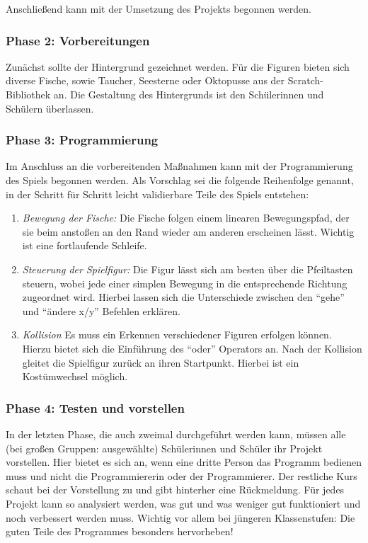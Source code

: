 Anschließend kann mit der Umsetzung des Projekts begonnen werden.

\subsubsection{Phase 2: Vorbereitungen}\label{phase-2-vorbereitungen}

Zunächst sollte der Hintergrund gezeichnet werden. Für die Figuren
bieten sich diverse Fische, sowie Taucher, Seesterne oder Oktopusse aus
der Scratch-Bibliothek an. Die Gestaltung des Hintergrunds ist den
Schülerinnen und Schülern überlassen.

\subsubsection{Phase 3: Programmierung}\label{phase-3-programmierung}

Im Anschluss an die vorbereitenden Maßnahmen kann mit der Programmierung
des Spiels begonnen werden. Als Vorschlag sei die folgende Reihenfolge
genannt, in der Schritt für Schritt leicht validierbare Teile des Spiels
entstehen:

\begin{enumerate}
\item
  \emph{Bewegung der Fische:} Die Fische folgen einem linearen
  Bewegungspfad, der sie beim anstoßen an den Rand wieder am anderen
  erscheinen lässt. Wichtig ist eine fortlaufende Schleife.
\item
  \emph{Steuerung der Spielfigur:} Die Figur lässt sich am besten über
  die Pfeiltasten steuern, wobei jede einer simplen Bewegung in die
  entsprechende Richtung zugeordnet wird. Hierbei lassen sich die
  Unterschiede zwischen den ``gehe'' und ``ändere x/y'' Befehlen
  erklären.
\item
  \emph{Kollision} Es muss ein Erkennen verschiedener Figuren erfolgen
  können. Hierzu bietet sich die Einführung des ``oder'' Operators an.
  Nach der Kollision gleitet die Spielfigur zurück an ihren Startpunkt.
  Hierbei ist ein Kostümwechsel möglich.
\end{enumerate}

\subsubsection{Phase 4: Testen und
vorstellen}\label{phase-4-testen-und-vorstellen}

In der letzten Phase, die auch zweimal durchgeführt werden kann, müssen
alle (bei großen Gruppen: ausgewählte) Schülerinnen und Schüler ihr
Projekt vorstellen. Hier bietet es sich an, wenn eine dritte Person das
Programm bedienen muss und nicht die Programmiererin oder der
Programmierer. Der restliche Kurs schaut bei der Vorstellung zu und gibt
hinterher eine Rückmeldung. Für jedes Projekt kann so analysiert werden,
was gut und was weniger gut funktioniert und noch verbessert werden
muss. Wichtig vor allem bei jüngeren Klassenstufen: Die guten Teile des
Programmes besonders hervorheben!

